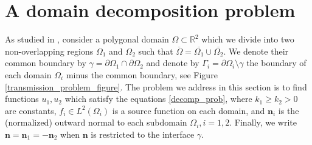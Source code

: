 \section{A domain decomposition problem}\label{domain_decomp_problem}

As studied in \cite{gustafsson2019error}, consider a polygonal domain \(\Omega \subset \mathbb{R}^2\) which we divide into two non-overlapping regions \(\Omega_1\) and \(\Omega_2\) such that \(\overline{\Omega} = \overline{\Omega_1} \cup \overline{\Omega_2}\). We denote their common boundary by \(\gamma = \partial\Omega_1 \cap \partial\Omega_2\) and denote by \(\Gamma_i = \partial\Omega_i\setminus{\gamma}\) the boundary of each domain \(\Omega_i\) minus the common boundary, see Figure \ref{transmission_problem_figure}. The problem we address in this section is to find functions \(u_1, u_2\) which satisfy the equations \eqref{decomp_prob}, where \(k_1 \geq k_2 > 0\) are constants, \(f_i \in L^2(\Omega_i)\) is a source function on each domain, and \(\boldsymbol{n}_i\) is the (normalized) outward normal to each subdomain \(\Omega_i, i=1, 2\). Finally, we write \(\boldsymbol{n}=\boldsymbol{n}_1=-\boldsymbol{n}_2\) when \(\boldsymbol{n}\) is restricted to the interface \(\gamma\).

